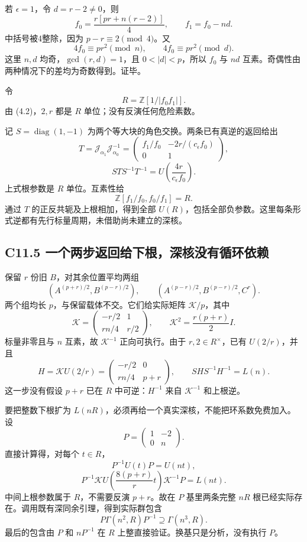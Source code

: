 \documentclass[11pt,a4paper]{article}
\theoremstyle{definition}
\numberwithin{equation}{section}
\begin{document}
{若} \(\epsilon=1\){，令} \(d=r-2\ne0\){，则} \[
f_0=\frac{r[pr+n(r-2)]}{4},\qquad f_1=f_0-nd.
\] {中括号被4整除，因为} \(p-r\equiv2\pmod4\){。又} \[
4f_0\equiv pr^2\pmod n,\qquad
4f_0\equiv pr^2\pmod d.
\] {这里} \(n,d\) {均奇，}\(\gcd(r,d)=1\){，且} \(0<|d|<p\){，所以} \(f_0\) {与} \(nd\) {互素。奇偶性由两种情况下的差均为奇数得到。证毕。}

{令} \[
R=\mathbb Z[1/|f_0f_1|].
\tag{C11.4.3}
\] {由} {(4.2)，}\(2,r\) {都是} \(R\) {单位；没有反演任何危险素数。}

{记} \(S=\operatorname{diag}(1,-1)\) {为两个等大块的角色交换。两条已有真逆的返回给出} \[
T=\mathcal J_{\alpha_1}\mathcal J_{\alpha_0}^{-1}
=\begin{pmatrix}
f_1/f_0&-2r/(c_\epsilon f_0)\\0&1
\end{pmatrix},
\] \[
\boxed{STS^{-1}T^{-1}=U\!\left(\frac{4r}{c_\epsilon f_0}\right).}
\tag{C11.4.4}
\] {上式根参数是} \(R\) {单位。互素性给} \[
\mathbb Z[f_1/f_0,f_0/f_1]=R.
\] {通过} \(T\) {的正反共轭及上根相加，得到全部} \(U(R)\){，包括全部负参数。这里每条形式逆都有先行标量周期，未借助尚未建立的深核。}

\subsection*{\texorpdfstring{{C11.5} {一个两步返回给下根，深核没有循环依赖}}{C11.5 一个两步返回给下根，深核没有循环依赖}}\label{C11-h82}

{保留} \(r\) {份旧} \(B\){，对其余位置平均两组} \[
\left(A^{(p+r)/2},B^{(p-r)/2}\right),\qquad
\left(A^{(p-r)/2},B^{(p-r)/2},C^r\right).
\tag{C11.5.1}
\] {两个组均长} \(p\){，与保留载体不交。它们给实际矩阵} \(\mathcal K/p\){，其中} \[
\mathcal K=
\begin{pmatrix}-r/2&1\\rn/4&r/2\end{pmatrix},
\qquad
\mathcal K^2=\frac{r(p+r)}2 I.
\tag{C11.5.2}
\] {标量非零且与} \(n\) {互素，故} \(\mathcal K^{-1}\) {正向可执行。由于} \(r,2\in R^\times\){，已有} \(U(2/r)\){，并且} \[
H=\mathcal K U(2/r)
=\begin{pmatrix}-r/2&0\\rn/4&p+r\end{pmatrix},
\qquad
\boxed{SHS^{-1}H^{-1}=L(n).}
\tag{C11.5.3}
\] {这一步没有假设} \(p+r\) {已在} \(R\) {中可逆：}\(H^{-1}\) {来自} \(\mathcal K^{-1}\) {和上根逆。}

{要把整数下根扩为} \(L(nR)\){，必须再给一个真实深核，不能把环系数免费加入。设} \[
P=\begin{pmatrix}1&-2\\0&n\end{pmatrix}.
\] {直接计算得，对每个} \(t\in R\){，} \[
P^{-1}U(t)P=U(nt),
\] \[
P^{-1}\mathcal K
U\!\left(\frac{8(p+r)}r t\right)
\mathcal K^{-1}P=L(nt).
\tag{C11.5.4}
\] {中间上根参数属于} \(R\){，不需要反演} \(p+r\){。故在} \(P\) {基里两条完整} \(nR\) {根已经实际存在。调用既有深同余引理，得到实际群包含} \[
P\Gamma(n^2,R)P^{-1}\supseteq\Gamma(n^3,R).
\tag{C11.5.5}
\] {最后的包含由} \(P\) {和} \(nP^{-1}\) {在} \(R\) {上整直接验证。换基只是分析，没有执行} \(P\){。}
\end{document}
